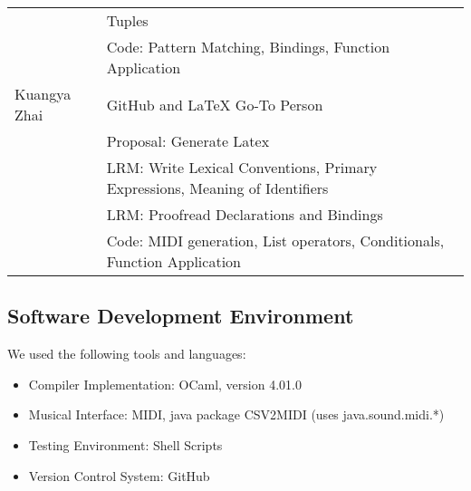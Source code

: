 \begin{table}[htdp]
\begin{tabular}{|l|l|}
										& Tuples \\
										& Code: Pattern Matching, Bindings, Function Application \\
		Kuangya Zhai & GitHub and LaTeX Go-To Person \\ 
								& Proposal: Generate Latex \\
								& LRM: Write Lexical Conventions, Primary Expressions, Meaning of Identifiers \\
								& LRM:  Proofread Declarations and Bindings \\
								& Code: MIDI generation, List operators, Conditionals, Function Application \\
		\hline
		\end{tabular}
		\end{table} 
		
	\subsection{Software Development Environment}
		We used the following tools and languages:
		\begin{itemize}
		\item Compiler Implementation: OCaml, version 4.01.0
		\item Musical Interface: MIDI, java package CSV2MIDI (uses java.sound.midi.*) ~\cite{csv2midi} 
		\item Testing Environment: Shell Scripts
		\item Version Control System: GitHub
		\end{itemize}
	
